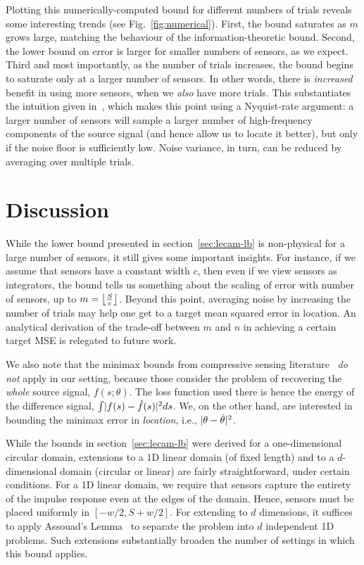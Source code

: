 \documentclass[conference]{IEEEtran}
\DeclarePairedDelimiter\abs{\lvert}{\rvert}
\DeclarePairedDelimiter\floor{\lfloor}{\rfloor}
\begin{document}
Plotting this numerically-computed bound for different numbers of trials
reveals some interesting trends (see Fig.~\ref{fig:numerical}). First, the
bound saturates as $m$ grows large, matching the behaviour of the
information-theoretic bound. Second, the lower bound on error is larger for
smaller numbers of sensors, as we expect. Third and most importantly, as the
number of trials increases, the bound begins to saturate only at a larger
number of sensors. In other words, there is \emph{increased} benefit in using
more sensors, when we \emph{also} have more trials. This substantiates the
intuition given in~\cite{Grover2016Information}, which makes this point using a
Nyquist-rate argument: a larger number of sensors will sample a larger number
of high-frequency components of the source signal (and hence allow us to locate
it better), but only if the noise floor is sufficiently low. Noise variance, in
turn, can be reduced by averaging over multiple trials.

\section{Discussion}
\label{sec:discussion}

While the lower bound presented in section~\ref{sec:lecam-lb} is non-physical
for a large number of sensors, it still gives some important insights. For
instance, if we assume that sensors have a constant width $c$, then even if we
view sensors as integrators, the bound tells us something about the scaling of
error with number of sensors, up to $m = \floor*{\frac{S}{c}}$. Beyond this
point, averaging noise by increasing the number of trials may help one get to a
target mean squared error in location. An analytical derivation of the
trade-off between $m$ and $n$ in achieving a certain target MSE is relegated to
future work.

We also note that the minimax bounds from compressive sensing
literature~\cite{AriasCastro2013Fundamental} \emph{do not} apply in our
setting, because those consider the problem of recovering the \emph{whole}
source signal, $f(s;\theta)$. The loss function used there is hence the energy
of the difference signal, $\int \abs{f(s) - \hat f(s)}^2 ds$. We, on the other
hand, are interested in bounding the minimax error in \emph{location}, i.e.,
$\abs{\theta - \hat\theta}^2$.

While the bounds in section~\ref{sec:lecam-lb} were derived for a
one-dimensional circular domain, extensions to a 1D linear domain (of fixed
length) and to a $d$-dimensional domain (circular or linear) are fairly
straightforward, under certain conditions. For a 1D linear domain, we require
that sensors capture the entirety of the impulse response even at the edges of
the domain. Hence, sensors must be placed uniformly in $[-w/2, S{+}w/2]$. For
extending to $d$ dimensions, it suffices to apply Assouad's
Lemma~\cite{Tsybakov2009Introduction} to separate the problem into $d$
independent 1D problems. Such extensions substantially broaden the number of
settings in which this bound applies.
\end{document}
